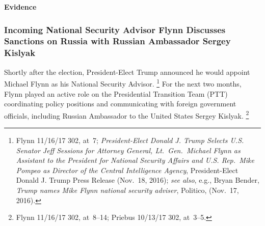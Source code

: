 \begin{center}
\textbf{Evidence}
\end{center}

\subsubsection{Incoming National Security Advisor Flynn Discusses Sanctions on Russia with Russian Ambassador Sergey Kislyak}

Shortly after the election, President-Elect Trump announced he would appoint Michael Flynn as his National Security Advisor.%
\footnote{Flynn 11/16/17 302, at~7;
\textit{President-Elect Donald J. Trump Selects U.S. Senator Jeff Sessions for Attorney General, Lt.~Gen.\ Michael Flynn as Assistant to the President for National Security Affairs and U.S. Rep.~Mike Pompeo as Director of the Central Intelligence Agency}, President-Elect Donald J. Trump Press Release (Nov.~18, 2016);
\textit{see also}, e.g., Bryan Bender, \textit{Trump names Mike Flynn national security adviser}, Politico, (Nov.~17, 2016).}
For the next two months, Flynn played an active role on the Presidential Transition Team (PTT) coordinating policy positions and communicating with foreign government officials, including Russian Ambassador to the United States Sergey Kislyak.%
\footnote{Flynn 11/16/17 302, at~8--14;
Priebus 10/13/17 302, at~3--5.}

